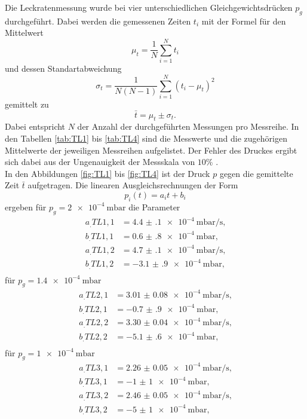 Die Leckratenmessung wurde bei vier unterschiedlichen Gleichgewichtsdrücken $p_g$ durchgeführt. Dabei werden die gemessenen Zeiten $t_i$ mit der Formel für den Mittelwert
\begin{equation}
\mu_t = \frac{1}{N}\sum_{i=1}^{N}t_i
\end{equation} 
und dessen Standartabweichung
\begin{equation}
\sigma_t = \frac{1}{N(N-1)}\sum_{i=1}^{N}(t_i-\mu_t)^2
\end{equation} 
gemittelt zu
\begin{equation}
\bar{t} = \mu_t\pm \sigma_t\text{.}
\end{equation} 
Dabei entspricht $N$ der Anzahl der durchgeführten Messungen pro Messreihe.
In den Tabellen \ref{tab:TL1} bis \ref{tab:TL4} sind die Messwerte und die zugehörigen Mittelwerte der jeweiligen Messreihen aufgelistet. Der Fehler des Druckes ergibt sich dabei aus der Ungenauigkeit der Messskala von $10\%$ \cite{V70}.\\
In den Abbildungen \ref{fig:TL1} bis \ref{fig:TL4} ist der Druck $p$ gegen die gemittelte Zeit $\bar{t}$ aufgetragen.
Die linearen Ausgleichsrechnungen der Form
\[
p_i(t) = a_it+b_i
\]
ergeben für $p_g = \SI{2e-4}{\milli\bar}$ die Parameter
\begin{align*}
a_.{TL1,1} &= \SI{4.4(1)e-4}{\milli\bar\per\second} \text{,}\\
b_.{TL1,1} &= \SI{0.6(8)e-4}{\milli\bar} \text{,}\\
a_.{TL1,2} &= \SI{4.7(1)e-4}{\milli\bar\per\second} \text{,}\\
b_.{TL1,2} &= \SI{-3.1(9)e-4}{\milli\bar} \text{,}\\
\end{align*}
für $p_g = \SI{1.4e-4}{\milli\bar}$
\begin{align*}
a_.{TL2,1} &= \SI{3.01(8)e-4}{\milli\bar\per\second} \text{,}\\
b_.{TL2,1} &= \SI{-0.7(9)e-4}{\milli\bar} \text{,}\\
a_.{TL2,2} &= \SI{3.30(4)e-4}{\milli\bar\per\second} \text{,}\\
b_.{TL2,2} &= \SI{-5.1(6)e-4}{\milli\bar} \text{,}\\
\end{align*}
für $p_g = \SI{1e-4}{\milli\bar}$
\begin{align*}
a_.{TL3,1} &= \SI{2.26(5)e-4}{\milli\bar\per\second} \text{,}\\
b_.{TL3,1} &= \SI{-1(1)e-4}{\milli\bar} \text{,}\\
a_.{TL3,2} &= \SI{2.46(5)e-4}{\milli\bar\per\second} \text{,}\\
b_.{TL3,2} &= \SI{-5(1)e-4}{\milli\bar} \text{,}\\
\end{align*}

